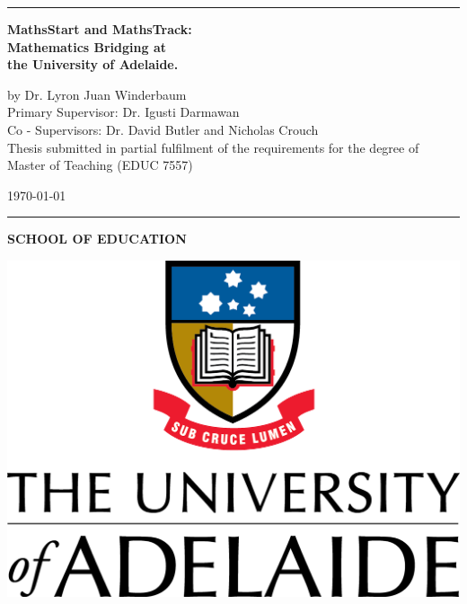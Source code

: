 \documentclass[twoside,12pt,a4paper]{report}
\begin{document}
\begin{titlepage}

\begin{flushleft}
\null
\vspace{2 cm}
\hrule
\vspace{1 cm}
{\huge{\bf MathsStart and MathsTrack: \\[2pt] Mathematics Bridging at \\[6pt] the University of Adelaide.}}
\vspace*{2cm}

\vspace{5.5 cm}
{\large by Dr. Lyron Juan Winderbaum}\\
\vspace{1 cm}
{\large Primary Supervisor: Dr. Igusti Darmawan}\\
\vspace{0.5 cm}
{\large Co - Supervisors: Dr. David Butler and Nicholas Crouch}\\
\vspace{2 cm}
{ Thesis submitted in partial fulfilment of the requirements for the degree of Master of Teaching (EDUC 7557)}\\
\vspace{0.5 cm}
\end{flushleft}

\begin{flushright}
{\monthyeardate\today }
\end{flushright}

\vspace{0.5 cm}
\hrule
\vspace{0.65cm}

\begin{flushleft}
\textbf{SCHOOL OF EDUCATION}
\end{flushleft}
\vspace{-1.5cm}
\begin{flushright}
\includegraphics[scale=0.75]{./files/UoA_logo_col_vert.png}
\end{flushright}
\vspace{-2 cm}

\end{titlepage}
\end{document}

